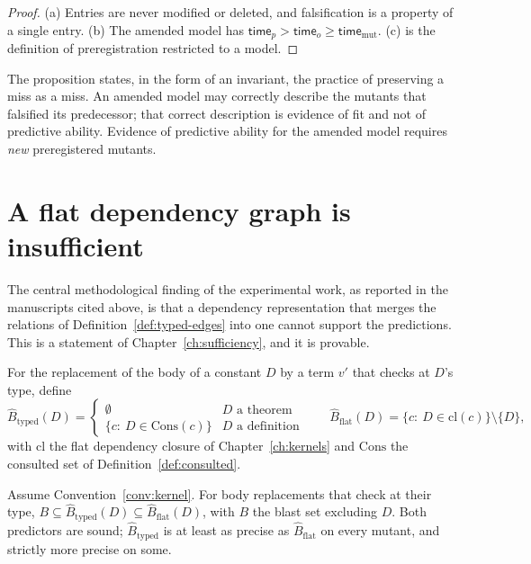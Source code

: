 \begin{proof}
(a) Entries are never modified or deleted, and falsification is a property of a single entry. (b) The amended model has $\mathsf{time}_p>\mathsf{time}_o\ge\mathsf{time}_{\mathrm{mut}}$. (c) is the definition of preregistration restricted to a model.
\end{proof}

The proposition states, in the form of an invariant, the practice of preserving a miss as a miss. An amended model may correctly describe the mutants that falsified its predecessor; that correct description is evidence of fit and not of predictive ability. Evidence of predictive ability for the amended model requires \emph{new} preregistered mutants.

\section{A flat dependency graph is insufficient}

The central methodological finding of the experimental work, as reported in the manuscripts cited above, is that a dependency representation that merges the relations of Definition~\ref{def:typed-edges} into one cannot support the predictions. This is a statement of Chapter~\ref{ch:sufficiency}, and it is provable.

\begin{definition}
\label{def:flat-typed}
For the replacement of the body of a constant $D$ by a term $v'$ that checks at $D$'s type, define
\[
\widehat B_{\mathrm{typed}}(D)=\begin{cases}\emptyset&D\text{ a theorem}\\ \{c:\ D\in\mathrm{Cons}(c)\}&D\text{ a definition}\end{cases}
\qquad
\widehat B_{\mathrm{flat}}(D)=\{c:\ D\in\mathrm{cl}(c)\}\setminus\{D\},
\]
with $\mathrm{cl}$ the flat dependency closure of Chapter~\ref{ch:kernels} and $\mathrm{Cons}$ the consulted set of Definition~\ref{def:consulted}.
\end{definition}

\begin{proposition}
\label{prop:flat-typed}
Assume Convention~\ref{conv:kernel}. For body replacements that check at their type, $B\subseteq\widehat B_{\mathrm{typed}}(D)\subseteq\widehat B_{\mathrm{flat}}(D)$, with $B$ the blast set excluding $D$. Both predictors are sound; $\widehat B_{\mathrm{typed}}$ is at least as precise as $\widehat B_{\mathrm{flat}}$ on every mutant, and strictly more precise on some.
\end{proposition}

